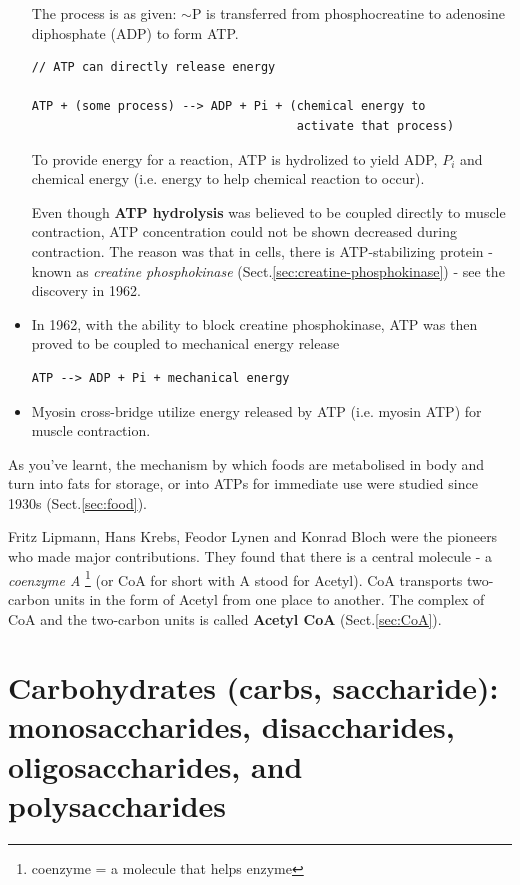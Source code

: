 \begin{itemize}
The process is as given: $\sim$P is transferred from phosphocreatine to
adenosine diphosphate (ADP) to form ATP.
  
\begin{verbatim}
// ATP can directly release energy

ATP + (some process) --> ADP + Pi + (chemical energy to 
                                     activate that process)
\end{verbatim}
To provide energy for a reaction, ATP is hydrolized to yield ADP, $P_i$
and chemical energy (i.e. energy to help chemical reaction to occur).

  Even though {\bf ATP hydrolysis} was believed to be coupled directly
  to muscle contraction, ATP concentration could not be shown
  decreased during contraction. The reason was that in cells, there is
  ATP-stabilizing protein - known as {\it creatine phosphokinase}
  (Sect.\ref{sec:creatine-phosphokinase}) - see the discovery in 1962.

\item In 1962, with the ability to block creatine phosphokinase, ATP
  was then proved to be coupled to mechanical energy release 
  
\begin{verbatim}
ATP --> ADP + Pi + mechanical energy
\end{verbatim}

\item Myosin cross-bridge utilize energy released by ATP (i.e. myosin ATP) for
muscle contraction. 
  
\end{itemize}

As you've learnt, the mechanism by which foods are metabolised in body and turn
into fats for storage, or into ATPs for immediate use were studied since 1930s
(Sect.\ref{sec:food}).
  
Fritz Lipmann, Hans Krebs, Feodor Lynen and Konrad Bloch were the pioneers who
made major contributions. They found that there is a central molecule - a {\it
coenzyme A} \footnote{coenzyme = a molecule that helps enzyme} (or CoA for
short with A stood for Acetyl). CoA transports two-carbon units in the form
of Acetyl from one place to another. The complex of CoA and the two-carbon
units is called {\bf Acetyl CoA} (Sect.\ref{sec:CoA}).





\section{Carbohydrates (carbs, saccharide): monosaccharides, disaccharides,
oligosaccharides, and polysaccharides}
\label{sec:carbohydrates}
\label{sec:saccharide}

